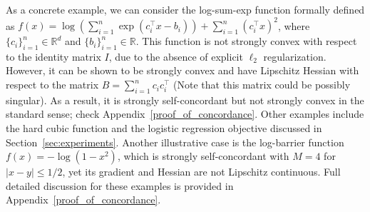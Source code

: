 \documentclass[11pt,letterpaper]{article}
\newcommand\0{{\Vector{0}}}
\newcommand\1{{\Vector{1}}}
\numberwithin{assumption}{section}
\numberwithin{definition}{section}
\numberwithin{theorem}{section}
\numberwithin{remark}{section}
\begin{document}


As a concrete example, we can consider the log-sum-exp function formally defined as $f(x) = \log{(\sum_{i = 1}^{n}\exp({c_i^\top x - b_i}))} + \sum_{i = 1}^{n}(c_i^\top x)^2$, where $\{c_i\}_{i = 1}^{n} \in \mathbb{R}^d$ and $\{b_i\}_{i = 1}^{n} \in \mathbb{R}$. This function is not strongly convex with respect to the identity matrix $I$, due to the absence of explicit $\ell_2$ regularization. However, it can be shown to be strongly convex and have Lipschitz Hessian with respect to the matrix $B = \sum_{i = 1}^{n}c_ic_i^\top$ (Note that this matrix could be possibly singular). As a result, it is strongly self-concordant but not strongly convex in the standard sense; check Appendix~\ref{proof_of_concordance}. Other examples include the hard cubic function and the logistic regression objective discussed in Section~\ref{sec:experiments}. Another illustrative case is the log-barrier function $f(x) = -\log(1 - x^2)$, which is strongly self-concordant with $M = 4$ for $|x - y| \leq 1/2$, yet its gradient and Hessian are not Lipschitz continuous. Full detailed discussion for these examples is provided in Appendix~\ref{proof_of_concordance}.
\end{document}
